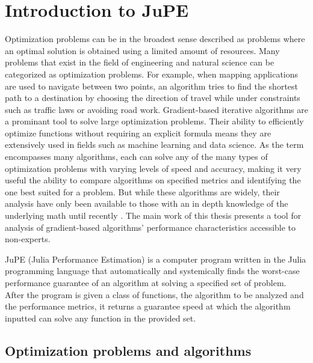 \chapter{Introduction to JuPE}

Optimization problems can be in the broadest sense described as problems where an optimal solution is obtained using a limited amount of resources. Many problems that exist in the field of engineering and natural science can be categorized as optimization problems. For example, when mapping applications are used to navigate between two points, an algorithm tries to find the shortest path to a destination by choosing the direction of travel while under constraints such as traffic laws or avoiding road work.
Gradient-based iterative algorithms are a prominant tool to solve large optimization problems. Their ability to efficiently optimize functions without requiring an explicit formula means they are extensively used in fields such as machine learning and data science. As the term encompasses many algorithms, each can solve any of the many types of optimization problems with varying levels of speed and accuracy, making it very useful the ability to compare algorithms on specified metrics and identifying the one best suited for a problem. But while these algorithms are widely, their analysis have only been available to those with an in depth knowledge of the underlying math until recently \cite{pepit}. The main work of this thesis presents a tool for analysis of gradient-based algorithms' performance characteristics accessible to non-experts.

JuPE (Julia Performance Estimation) is a computer program written in the Julia programming language that automatically and systemically finds the worst-case performance guarantee of an algorithm at solving a specified set of problem. After the program is given a class of functions, the algorithm to be analyzed and the performance metrics, it returns a guarantee speed at which the algorithm inputted can solve any function in the provided set.


\section{Optimization problems and algorithms}

